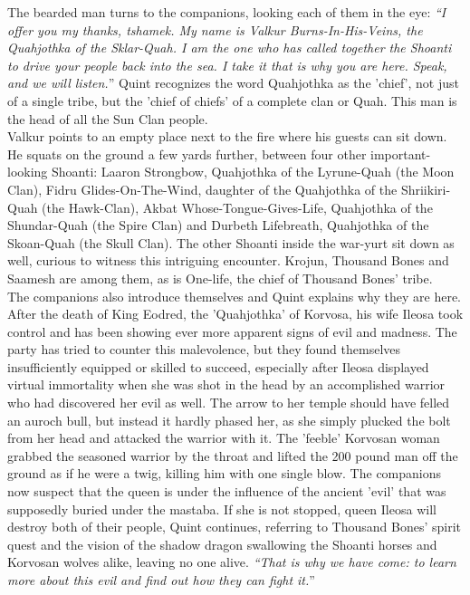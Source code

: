 The bearded man turns to the companions, looking each of them in the eye: {\itshape``I offer you my thanks, tshamek. My name is Valkur Burns-In-His-Veins, the Quahjothka of the Sklar-Quah. I am the one who has called together the Shoanti to drive your people back into the sea. I take it that is why you are here. Speak, and we will listen.}'' Quint recognizes the word Quahjothka as the 'chief', not just of a single tribe, but the 'chief of chiefs' of a complete clan or Quah. This man is the head of all the Sun Clan people.\\

Valkur points to an empty place next to the fire where his guests can sit down. He squats on the ground a few yards further, between four other important-looking Shoanti: Laaron Strongbow, Quahjothka of the Lyrune-Quah (the Moon Clan), Fidru Glides-On-The-Wind, daughter of the Quahjothka of the Shriikiri-Quah (the Hawk-Clan), Akbat Whose-Tongue-Gives-Life, Quahjothka of the Shundar-Quah (the Spire Clan) and Durbeth Lifebreath, Quahjothka of the Skoan-Quah (the Skull Clan). The other Shoanti inside the war-yurt sit down as well, curious to witness this intriguing encounter. Krojun, Thousand Bones and Saamesh are among them, as is One-life, the chief of Thousand Bones' tribe.\\

The companions also introduce themselves and Quint explains why they are here. After the death of King Eodred, the 'Quahjothka' of Korvosa, his wife Ileosa took control and has been showing ever more apparent signs of evil and madness. The party has tried to counter this malevolence, but they found themselves insufficiently equipped or skilled to succeed, especially after Ileosa displayed virtual immortality when she was shot in the head by an accomplished warrior who had discovered her evil as well. The arrow to her temple should have felled an auroch bull, but instead it hardly phased her, as she simply plucked the bolt from her head and attacked the warrior with it. The 'feeble' Korvosan woman grabbed the seasoned warrior by the throat and lifted the 200 pound man off the ground as if he were a twig, killing him with one single blow. The companions now suspect that the queen is under the influence of the ancient 'evil' that was supposedly buried under the mastaba. If she is not stopped, queen Ileosa will destroy both of their people, Quint continues, referring to Thousand Bones' spirit quest and the vision of the shadow dragon swallowing the Shoanti horses and Korvosan wolves alike, leaving no one alive. {\itshape``That is why we have come: to learn more about this evil and find out how they can fight it.}''\\

